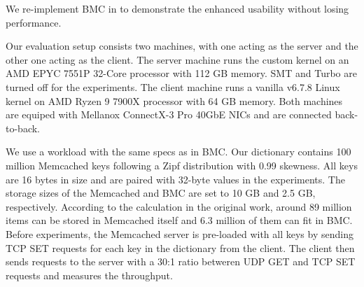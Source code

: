 We re-implement BMC in \projname{} to demonstrate the enhanced usability
    without losing performance.

Our evaluation setup consists two machines, with one
    acting as the server and the other one acting as the client.
The server machine runs the \projname{} custom kernel on an AMD EPYC 7551P
    32-Core processor with 112 GB memory.
SMT and Turbo are turned off for the experiments.
The client machine runs a vanilla v6.7.8 Linux kernel on AMD Ryzen 9 7900X
    processor with 64 GB memory.
Both machines are equiped with Mellanox ConnectX-3 Pro 40GbE NICs and are
    connected back-to-back.


We use a workload with the same specs as in BMC.
Our dictionary contains 100 million Memcached keys following a Zipf
    distribution with 0.99 skewness.
All keys are 16 bytes in size and are paired with 32-byte values in the
    experiments.
The storage sizes of the Memcached and BMC are set to 10 GB and 2.5 GB,
    respectively.
According to the calculation in the original work, around 89 million items
    can be stored in Memcached itself and 6.3 million of them can fit in
    BMC.
Before experiments, the Memcached server is pre-loaded with all keys by
    sending TCP SET requests for each key in the dictionary from the client.
The client then sends requests to the server with a 30:1 ratio betweren UDP GET and
    TCP SET requests and measures the throughput.
